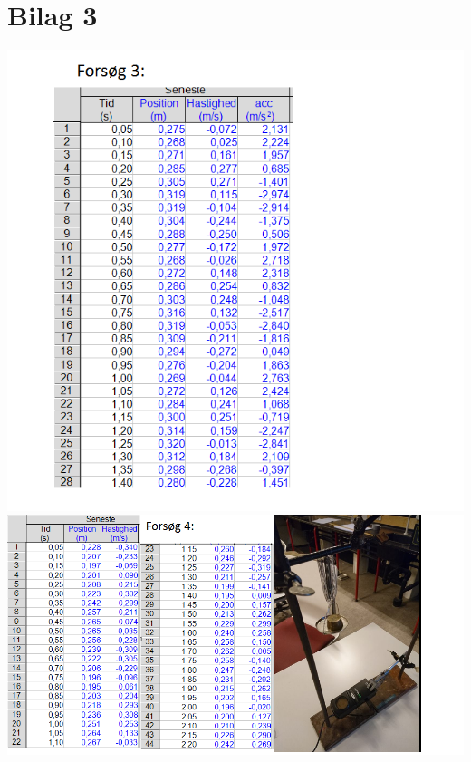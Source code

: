 \section*{Bilag 3}
\begin{center}
\includegraphics[scale=0.6]{Billeder/forsoeg3}
\includegraphics[scale=0.7]{Billeder/forsoeg4}
\end{center}
